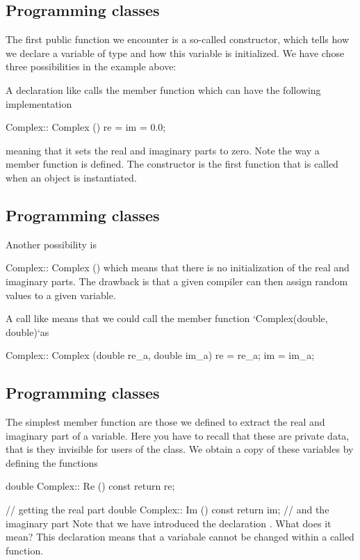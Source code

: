 \documentclass[%
twoside,                 %
final,                   %
10pt]{article}
\begin{document}
{{{{{{{{{%
\subsection{Programming classes}

The first public function we encounter is a so-called
constructor, which  tells how we declare a variable of type 
and how this variable is initialized. We have chose  three possibilities in the example above:

A declaration like  calls the member function  which can have the following implementation

\bcppcod
Complex:: Complex () { re = im = 0.0; }
\ecppcod

meaning that it sets the real and imaginary parts to zero. Note the
way a member function is defined. The constructor is the first
function that is called when an object is instantiated.

\subsection{Programming classes}

Another possibility is

\bcppcod
Complex:: Complex () {}
\ecppcod
which means that there is no initialization of the real and imaginary parts. The drawback is that a given compiler can then assign random values to a given variable.

A call like  means that we could call the member function `Complex(double, double)`as

\bcppcod
Complex:: Complex (double re_a, double im_a) {
    re = re_a; im = im_a; }
\ecppcod

\subsection{Programming classes}

The simplest member function are those we defined to extract
the real and imaginary part of a variable. Here you have to recall that these are private data,
that is they invisible for users of the class.  We obtain a copy of these variables by defining the
functions

\bcppcod
double Complex:: Re () const { return re; }} //  getting the real part
double Complex:: Im () const { return im; }  //   and the imaginary part
\ecppcod
Note that we have introduced   the declaration  .  What does it mean?
This declaration means that a variabale cannot be changed within  a called function.

}}}}}}}}
\end{document}
